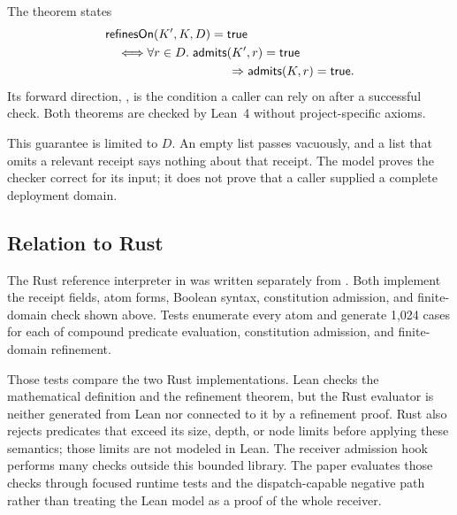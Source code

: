 The theorem  states
\[
\begin{aligned}
&\mathsf{refinesOn}(K',K,D)=\mathsf{true}\\
&\quad\Longleftrightarrow
  \forall r\in D.\;
  \mathsf{admits}(K',r)=\mathsf{true}\\
&\hspace{35mm}\Rightarrow
  \mathsf{admits}(K,r)=\mathsf{true}.
\end{aligned}
\]
Its forward direction,
, is the condition a caller can rely on after a
successful check. Both theorems are checked by Lean~4 without project-specific
axioms.

This guarantee is limited to \(D\). An empty list passes vacuously, and a list
that omits a relevant receipt says nothing about that receipt. The model proves
the checker correct for its input; it does not prove that a caller supplied a
complete deployment domain.

\subsection{Relation to Rust}

The Rust reference interpreter in  was written
separately from . Both implement the receipt fields,
atom forms, Boolean syntax, constitution admission, and finite-domain check
shown above. Tests enumerate every atom and generate 1,024 cases for each of
compound predicate evaluation, constitution admission, and finite-domain
refinement.

Those tests compare the two Rust implementations. Lean checks the mathematical
definition and the refinement theorem, but the Rust evaluator is neither
generated from Lean nor connected to it by a refinement proof. Rust also
rejects predicates that exceed its size, depth, or node limits before applying
these semantics; those limits are not modeled in Lean. The receiver admission
hook performs many checks outside this bounded library. The
paper evaluates those checks through focused runtime tests and the
dispatch-capable negative path rather than treating the Lean model as a proof
of the whole receiver.
